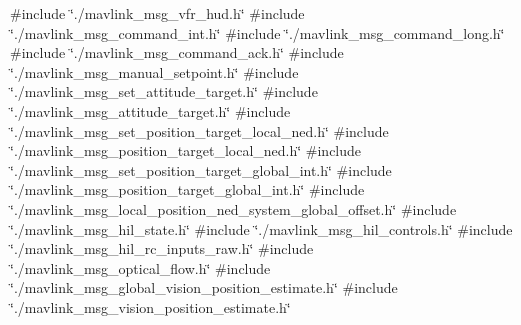 {\ttfamily \#include \char`\"{}./mavlink\+\_\+msg\+\_\+vfr\+\_\+hud.\+h\char`\"{}}\newline
{\ttfamily \#include \char`\"{}./mavlink\+\_\+msg\+\_\+command\+\_\+int.\+h\char`\"{}}\newline
{\ttfamily \#include \char`\"{}./mavlink\+\_\+msg\+\_\+command\+\_\+long.\+h\char`\"{}}\newline
{\ttfamily \#include \char`\"{}./mavlink\+\_\+msg\+\_\+command\+\_\+ack.\+h\char`\"{}}\newline
{\ttfamily \#include \char`\"{}./mavlink\+\_\+msg\+\_\+manual\+\_\+setpoint.\+h\char`\"{}}\newline
{\ttfamily \#include \char`\"{}./mavlink\+\_\+msg\+\_\+set\+\_\+attitude\+\_\+target.\+h\char`\"{}}\newline
{\ttfamily \#include \char`\"{}./mavlink\+\_\+msg\+\_\+attitude\+\_\+target.\+h\char`\"{}}\newline
{\ttfamily \#include \char`\"{}./mavlink\+\_\+msg\+\_\+set\+\_\+position\+\_\+target\+\_\+local\+\_\+ned.\+h\char`\"{}}\newline
{\ttfamily \#include \char`\"{}./mavlink\+\_\+msg\+\_\+position\+\_\+target\+\_\+local\+\_\+ned.\+h\char`\"{}}\newline
{\ttfamily \#include \char`\"{}./mavlink\+\_\+msg\+\_\+set\+\_\+position\+\_\+target\+\_\+global\+\_\+int.\+h\char`\"{}}\newline
{\ttfamily \#include \char`\"{}./mavlink\+\_\+msg\+\_\+position\+\_\+target\+\_\+global\+\_\+int.\+h\char`\"{}}\newline
{\ttfamily \#include \char`\"{}./mavlink\+\_\+msg\+\_\+local\+\_\+position\+\_\+ned\+\_\+system\+\_\+global\+\_\+offset.\+h\char`\"{}}\newline
{\ttfamily \#include \char`\"{}./mavlink\+\_\+msg\+\_\+hil\+\_\+state.\+h\char`\"{}}\newline
{\ttfamily \#include \char`\"{}./mavlink\+\_\+msg\+\_\+hil\+\_\+controls.\+h\char`\"{}}\newline
{\ttfamily \#include \char`\"{}./mavlink\+\_\+msg\+\_\+hil\+\_\+rc\+\_\+inputs\+\_\+raw.\+h\char`\"{}}\newline
{\ttfamily \#include \char`\"{}./mavlink\+\_\+msg\+\_\+optical\+\_\+flow.\+h\char`\"{}}\newline
{\ttfamily \#include \char`\"{}./mavlink\+\_\+msg\+\_\+global\+\_\+vision\+\_\+position\+\_\+estimate.\+h\char`\"{}}\newline
{\ttfamily \#include \char`\"{}./mavlink\+\_\+msg\+\_\+vision\+\_\+position\+\_\+estimate.\+h\char`\"{}}\newline
